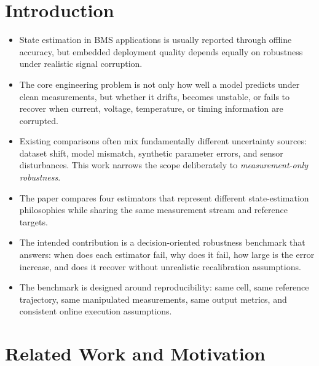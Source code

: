 \documentclass[review,nopreprintline]{elsarticle}
\begin{document}
\section{Introduction}
\begin{itemize}[leftmargin=*]
    \item State estimation in BMS applications is usually reported through offline accuracy, but embedded deployment quality depends equally on robustness under realistic signal corruption.
    \item The core engineering problem is not only how well a model predicts under clean measurements, but whether it drifts, becomes unstable, or fails to recover when current, voltage, temperature, or timing information are corrupted.
    \item Existing comparisons often mix fundamentally different uncertainty sources: dataset shift, model mismatch, synthetic parameter errors, and sensor disturbances. This work narrows the scope deliberately to \emph{measurement-only robustness}.
    \item The paper compares four estimators that represent different state-estimation philosophies while sharing the same measurement stream and reference targets.
    \item The intended contribution is a decision-oriented robustness benchmark that answers: when does each estimator fail, why does it fail, how large is the error increase, and does it recover without unrealistic recalibration assumptions.
    \item The benchmark is designed around reproducibility: same cell, same reference trajectory, same manipulated measurements, same output metrics, and consistent online execution assumptions.
\end{itemize}

\section{Related Work and Motivation}
\end{document}
